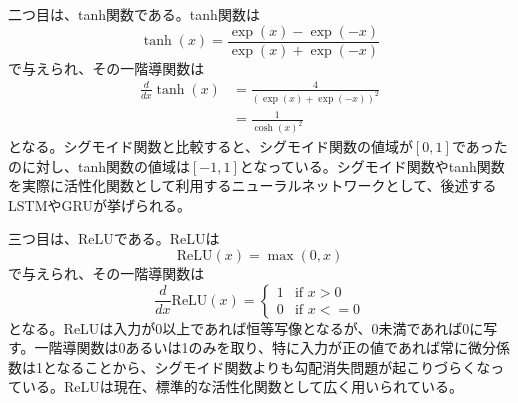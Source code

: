 \documentclass[12pt]{jarticle}
\numberwithin{equation}{section}    %
\numberwithin{figure}{section}      %
\numberwithin{table}{section}      %
\begin{document}
二つ目は、tanh関数である。tanh関数は
\begin{equation}
    \tanh(x) = \frac{\exp(x) - \exp(-x)}{\exp(x) + \exp(-x)}
\end{equation}
で与えられ、その一階導関数は
\begin{align}
    \frac{d}{dx}\tanh(x) & = \frac{4}{(\exp(x) + \exp(-x))^{2}} \\
                         & = \frac{1}{\cosh(x)^{2}}
\end{align}
となる。シグモイド関数と比較すると、シグモイド関数の値域が$[0, 1]$であったのに対し、tanh関数の値域は$[-1, 1]$となっている。シグモイド関数やtanh関数を実際に活性化関数として利用するニューラルネットワークとして、後述するLSTMやGRUが挙げられる。

三つ目は、ReLUである。ReLUは
\begin{equation}
    \text{ReLU}(x) = \max (0, x)
\end{equation}
で与えられ、その一階導関数は
\begin{equation}
    \frac{d}{dx}\text{ReLU}(x) =
    \begin{cases}
        1 & \text{if $x > 0$}  \\
        0 & \text{if $x <= 0$}
    \end{cases}
\end{equation}
となる。ReLUは入力が0以上であれば恒等写像となるが、0未満であれば0に写す。一階導関数は0あるいは1のみを取り、特に入力が正の値であれば常に微分係数は1となることから、シグモイド関数よりも勾配消失問題が起こりづらくなっている。ReLUは現在、標準的な活性化関数として広く用いられている。

\end{document}
